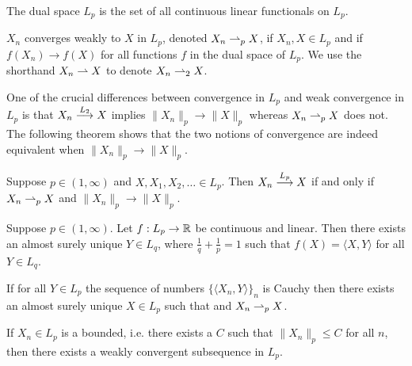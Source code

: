 \begin{shaded}

\begin{definition}
The dual space  $L_p$ is the set of all continuous linear functionals on $L_p$. 
\end{definition}

\begin{definition}
$X_n $ converges weakly to $X$ in $L_p$, denoted $X_n\rightharpoonup_p X$, if $X_n, X\in L_p$ and if $f(X_n)\rightarrow f(X)$ for all functions $f$ in the dual space of $L_p$. We use the shorthand $X_n\rightharpoonup X$ to denote $X_n\rightharpoonup_2 X$.
\end{definition}



One of the crucial differences between convergence in $L_p$ and weak convergence in $L_p$ is that $X_n \overset{\small L_2} \longrightarrow X$ implies $\|X_n\|_p\rightarrow \|X\|_p$ whereas $X_n\rightharpoonup_p X$ does not. The following theorem shows that the two notions of convergence are indeed equivalent when $\|X_n\|_p\rightarrow \|X\|_p$. 

\begin{theorem}
Suppose $p\in (1,\infty)$ and $X, X_1, X_2, \ldots \in L_p$. Then $X_n\overset{\small L_p} \longrightarrow X$ if and only if $X_n\rightharpoonup_p X$ and $\| X_n\|_p\rightarrow \| X \|_p$.   
\end{theorem}


\begin{theorem} 
Suppose $p\in (1,\infty)$. 
Let $f:L_p\rightarrow \Bbb R$ be continuous and linear. Then there exists an almost surely unique $Y\in L_q$, where $\frac{1}{q}+\frac{1}{p} = 1$ such that $f(X) = \langle X, Y\rangle$ for all $Y\in L_q$.
\end{theorem}



\begin{theorem}
\end{theorem}


\begin{theorem}
If for all $Y\in L_p$ the sequence of numbers $\{\langle X_n, Y\rangle \}_n$ is Cauchy then there exists an almost surely unique $X\in L_p$ such that  and  $X_n\rightharpoonup_p X$.
\end{theorem}



\begin{theorem}
If $X_n\in L_p$ is a bounded, i.e. there exists a $C$ such that $\| X_n \|_p\leq C$ for all $n$, then there exists a weakly convergent subsequence in $L_p$.
\end{theorem}




\end{shaded}




